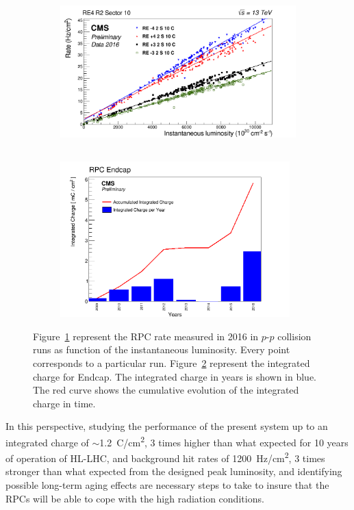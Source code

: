 	    \begin{figure}[!h]
		    \begin{subfigure}{\plotwidth}
	    		\begin{center}
		    		\includegraphics[height=6cm]{fig/RE4-rates-2016-data.png}\\
		        	\caption{\label{Fig:Rates-2016}}
	    		\end{center}
		    \end{subfigure}
		    \begin{subfigure}{\plotwidth}
	    		\begin{center}
		    		\includegraphics[height=6cm]{fig/Endcap-TOT-Qint-data.png}\\
		        	\caption{\label{Fig:Qint-2016}}
	    		\end{center}
		    \end{subfigure}
	        \caption{\label{Fig:Data-2016} Figure~\ref{Fig:Rates-2016} represent the RPC rate measured in 2016 in $p$-$p$ collision runs as function of the instantaneous luminosity. Every point corresponds to a particular run. Figure~\ref{Fig:Qint-2016} represent the integrated charge for Endcap. The integrated charge in years is shown in blue. The red curve shows the cumulative evolution of the integrated charge in time.}
	    \end{figure}
	    
	    In this perspective, studying the performance of the present system up to an integrated charge of $\sim$\SI{1.2}{C/cm^2}, 3 times higher than what expected for 10 years of operation of HL-LHC, and background hit rates of \SI{1200}{Hz/cm^2}, 3 times stronger than what expected from the designed peak luminosity, and identifying possible long-term aging effects are necessary steps to take to insure that the RPCs will be able to cope with the high radiation conditions.\\


